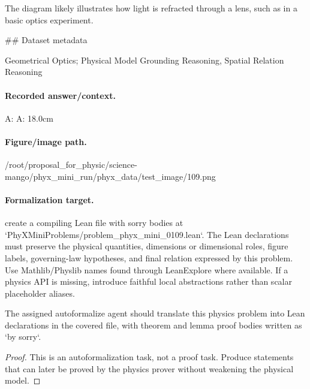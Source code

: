 The diagram likely illustrates how light is refracted through a lens, such as in a basic optics experiment.

\#\# Dataset metadata

Geometrical Optics; Physical Model Grounding Reasoning, Spatial Relation Reasoning

\paragraph{Recorded answer/context.}
A: A: 18.0cm

\paragraph{Figure/image path.}
/root/proposal\_for\_physic/science-mango/phyx\_mini\_run/phyx\_data/test\_image/109.png

\paragraph{Formalization target.}
create a compiling Lean file with sorry bodies at `PhyXMiniProblems/problem\_phyx\_mini\_0109.lean`. The Lean declarations must preserve the physical quantities, dimensions or dimensional roles, figure labels, governing-law hypotheses, and final relation expressed by this problem.
Use Mathlib/Physlib names found through LeanExplore where available. If a physics API is missing, introduce faithful local abstractions rather than scalar placeholder aliases.

\begin{theorem}
\label{thm:physics:phyx_mini_0109:target}
The assigned autoformalize agent should translate this physics problem into Lean declarations in the covered file, with theorem and lemma proof bodies written as `by sorry`.
\end{theorem}
\begin{proof}
This is an autoformalization task, not a proof task. Produce statements that can later be proved by the physics prover without weakening the physical model.
\end{proof}

